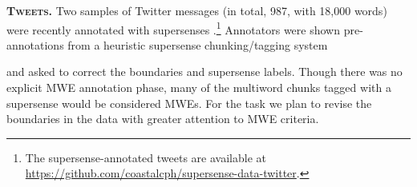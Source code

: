 \documentclass[11pt]{article}
\newcommand{\citeposs}[1]{\citeauthor{#1}'s (\citeyear{#1})}
\newcommand{\ensuretext}[1]{#1}
\newcommand{\nssmarker}{\ensuretext{\textcolor{magenta}{\ensuremath{^{\textsc{NS}}_{\textsc{S}}}}}}
\newcommand{\arkcomment}[3]{\ensuretext{\textcolor{#3}{[#1 #2]}}}
\newcommand{\nss}[1]{\arkcomment{\nssmarker}{#1}{magenta}}
\newcommand{\longversion}[1]{} %
\begin{document}
\textbf{\textsc{Tweets}.} Two samples of Twitter messages (in total, 987, with 18,000 words) 
were recently annotated with supersenses \citep{johannsen-14}\longversion{: 
(a)~the POS+NER-annotated data set of \citet{Ritter:ea:11}, 
and %
(b)~\citeposs{Plank:ea:14} sample of 200~tweets}.\footnote{The supersense-annotated tweets 
are available at \url{https://github.com/coastalcph/supersense-data-twitter}.}
Annotators were shown pre-annotations from a heuristic supersense chunking\slash tagging system%
\longversion{ (based on the most frequent sense of each word)}
and asked to correct the boundaries and supersense labels. 
Though there was no explicit MWE annotation phase, 
many of the multiword chunks tagged with a \longversion{noun or verb }supersense would be considered MWEs. 
For the task we plan to revise the boundaries in the data with greater attention to MWE criteria.
\end{document}
